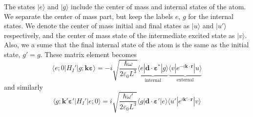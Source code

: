 \documentclass[11pt,letter]{article}
\newcommand{\bv}[1]{\ensuremath{\bm{#1}}}
\begin{document}
The states $|e\rangle$ and $|g\rangle$ include the center of mass and internal
states of the atom.  We separate the center of mass part, but keep the labels
$e$, $g$ for the internal states. We denote the center of mass initial and
final states as $| u \rangle$ and $|u'\rangle$ respectively, and the center of
mass state of the intermediate excited state as $| v\rangle$.   Also, we a sume
that the final internal state of the atom is the same as the initial state,
$g'=g$.  These matrix element becomes
\begin{equation}
   \langle e; 0 | H_{I}' | g; \bv{k}\bv{\varepsilon} \rangle = 
       -i \sqrt{ \frac{ \hbar \omega }{2 \varepsilon_{0} L^{3} }} 
      \underbrace{\langle e | \bv{d} \cdot \bv{\varepsilon}^{*} | g \rangle }_{\text{internal}}
      \underbrace{\langle v | e^{-i\bv{k}\cdot\bv{r}} | u \rangle}_{\text{external}}
\end{equation}
and similarly
\begin{equation}
   \langle g; \bv{k}'\bv{\varepsilon}' | H_{I}' | e; 0\rangle = 
       i \sqrt{ \frac{ \hbar \omega' }{2 \varepsilon_{0} L^{3} }} 
      \langle g | \bv{d} \cdot \bv{\varepsilon}' | e \rangle 
      \langle u' | e^{i\bv{k}'\cdot\bv{r}} | v \rangle
\end{equation}
\end{document}
